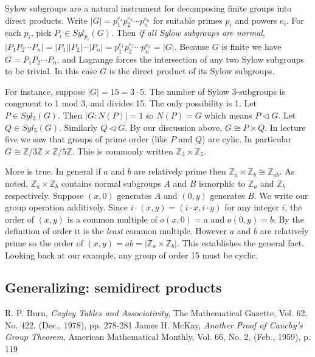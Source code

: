 \documentclass[letterpaper]{article}
\begin{document}
Sylow subgroups are a natural instrument for decomposing finite groups into direct products. Write $|G| = p_1^{e_1}p_2^{e_2}\cdots p_n^{e_n}$ for suitable primes $p_i$ and powers $e_i$. For each $p_i$, pick $P_i \in Syl_{p_i}(G)$. Then \emph{if all Sylow subgroups are normal}, $|P_1P_2\cdots P_n| = |P_1||P_2|\cdots |P_n| = p_1^{e_1}p_2^{e_2}\cdots p_n^{e_n} = |G|$. Because $G$ is finite we have $G = P_1P_2\cdots P_n$, and Lagrange forces the intersection of any two Sylow subgroups to be trivial. In this case $G$ is the direct product of its Sylow subgroups.

For instance, suppose $|G| = 15 = 3\cdot 5$. The number of Sylow 3-subgroups is congruent to 1 mod 3, and divides 15. The only possibility is 1. Let $P \in Syl_3(G)$. Then $|G \colon N(P)| = 1$ so $N(P) = G$ which means $P \lhd G$. Let $Q \in Syl_5(G)$. Similarly $Q \lhd G$. By our discussion above, $G \cong P \times Q$. In lecture five we saw that groups of prime order (like $P$ and $Q$) are cylic. In particular $G \cong \mathbb{Z}/3\mathbb{Z} \times \mathbb{Z}/5\mathbb{Z}$. This is commonly written $\mathbb{Z}_3 \times \mathbb{Z}_5$.

More is true. In general if $a$ and $b$ are relatively prime then $\mathbb{Z}_a \times \mathbb{Z}_b \cong \mathbb{Z}_{ab}$. As noted, $\mathbb{Z}_a \times \mathbb{Z}_b$ contains normal subgroups $A$ and $B$ ismorphic to $\mathbb{Z}_a$ and $\mathbb{Z}_b$ respectively. Suppose $(x, 0)$ generates $A$ and $(0, y)$ generates $B$. We write our group operation additively. Since $i \cdot (x, y) = (i \cdot x, i \cdot y)$ for any integer $i$, the order of $(x, y)$ is a common multiple of $o(x,0) = a$ and $o(0, y) = b$. By the definition of order it is the \emph{least} common multiple. However $a$ and $b$ are relatively prime so the order of $(x, y) = ab = |\mathbb{Z}_a \times \mathbb{Z}_b|$. This establishes the general fact. Looking back at our example, any group of order 15 must be cyclic.

\subsection{Generalizing: semidirect products}

\begin{thebibliography}{7}
 R. P. Burn, \emph{Cayley Tables and Associativity},
The Mathematical Gazette, Vol. 62, No. 422, (Dec., 1978), pp. 278-281
 James H. McKay, \emph{Another Proof of Cauchy's Group Theorem}, American Mathematical Monthly, Vol. 66, No. 2, (Feb., 1959), p. 119
\end{thebibliography}
\end{document}
